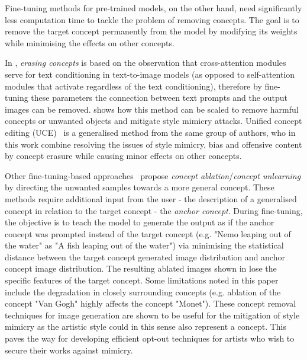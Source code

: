 \documentclass[conference]{IEEEtran}
\begin{document}
Fine-tuning methods for pre-trained models, on the other hand, need significantly less computation time to tackle the problem of removing concepts.
The goal is to remove the target concept permanently from the model by modifying its weights while minimising the effects on other concepts.

In \cite{gandikota_erasing_2023}, \textit{erasing concepts} is based on the observation that cross-attention modules serve for text conditioning in text-to-image models (as opposed to self-attention modules that activate regardless of the text conditioning), therefore by fine-tuning these parameters the connection between text prompts and the output images can be removed. 
 shows how this method can be scaled to remove harmful concepts or unwanted objects and mitigate style mimicry attacks.
Unified concept editing (UCE)~\cite{gandikota_unified_2024} is a generalised method from the same group of authors, who in this work combine resolving the issues of style mimicry, bias and offensive content by concept erasure while causing minor effects on other concepts.   

Other fine-tuning-based approaches~\cite{kumari_ablating_2023,zhang_forget-me-not_2023} propose \textit{concept ablation}/\textit{concept unlearning} by directing the unwanted samples towards a more general concept.
These methods require additional input from the user - the description of a generalised concept in relation to the target concept - the \textit{anchor concept}. 
During fine-tuning, the objective is to teach the model to generate the output as if the anchor concept was prompted instead of the target concept (e.g. "Nemo leaping out of the water" as "A fish leaping out of the water") via minimising the statistical distance between the target concept generated image distribution and anchor concept image distribution. 
The resulting ablated images shown in  lose the specific features of the target concept. 
Some limitations noted in this paper include the degradation in closely surrounding concepts (e.g. ablation of the concept "Van Gogh" highly affects the concept "Monet").
These concept removal techniques for image generation are shown to be useful for the mitigation of style mimicry as the artistic style could in this sense also represent a concept. 
This paves the way for developing efficient opt-out techniques for artists who wish to secure their works against mimicry. 
\end{document}

